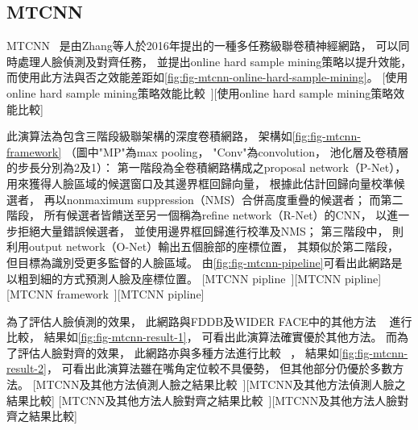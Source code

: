 \documentclass[class=NCU_thesis, crop=false]{standalone}
\begin{document}
\subsection{MTCNN}
MTCNN~\cite{zhang_joint_2016}
是由Zhang等人於2016年提出的一種多任務級聯卷積神經網路，
可以同時處理人臉偵測及對齊任務，
並提出online hard sample mining策略以提升效能，
而使用此方法與否之效能差距如\cref{fig:fig-mtcnn-online-hard-sample-mining}。
[使用online hard sample mining策略效能比較~\cite{zhang_joint_2016}][使用online hard sample mining策略效能比較]

此演算法為包含三階段級聯架構的深度卷積網路，
架構如\cref{fig:fig-mtcnn-framework}
（圖中"MP"為max pooling，
"Conv"為convolution，
池化層及卷積層的步長分別為2及1）：
第一階段為全卷積網路構成之proposal network（P-Net），
用來獲得人臉區域的候選窗口及其邊界框回歸向量，
根據此估計回歸向量校準候選者，
再以nonmaximum suppression（NMS）合併高度重疊的候選者；
而第二階段，
所有候選者皆饋送至另一個稱為refine network（R-Net）的CNN，
以進一步拒絕大量錯誤候選者，
並使用邊界框回歸進行校準及NMS；
第三階段中，
則利用output network（O-Net）輸出五個臉部的座標位置，
其類似於第二階段，
但目標為識別受更多監督的人臉區域。
由\cref{fig:fig-mtcnn-pipeline}可看出此網路是以粗到細的方式預測人臉及座標位置。
[MTCNN pipline~\cite{zhang_joint_2016}][MTCNN pipline]
[MTCNN framework~\cite{zhang_joint_2016}][MTCNN pipline]

為了評估人臉偵測的效果，
此網路與FDDB及WIDER FACE中的其他方法
~\cite{yang_aggregate_2014, mathias_face_2014, yan_fastest_2014, yang_facial_2015, chen_joint_2014, li_convolutional_2015, yang_convolutional_2015, farfade_multi-view_2015, yang_wider_2015}
進行比較，
結果如\cref{fig:fig-mtcnn-result-1}，
可看出此演算法確實優於其他方法。
而為了評估人臉對齊的效果，
此網路亦與多種方法進行比較
~\cite{cao_face_2014, yu_pose-free_2013, xiong_supervised_2013, burgos-artizzu_robust_2013, zhu_face_2012, zhang_facial_2014}，
結果如\cref{fig:fig-mtcnn-result-2}，
可看出此演算法雖在嘴角定位較不具優勢，
但其他部分仍優於多數方法。
[MTCNN及其他方法偵測人臉之結果比較~\cite{zhang_joint_2016}][MTCNN及其他方法偵測人臉之結果比較]
[MTCNN及其他方法人臉對齊之結果比較~\cite{zhang_joint_2016}][MTCNN及其他方法人臉對齊之結果比較]
\end{document}
